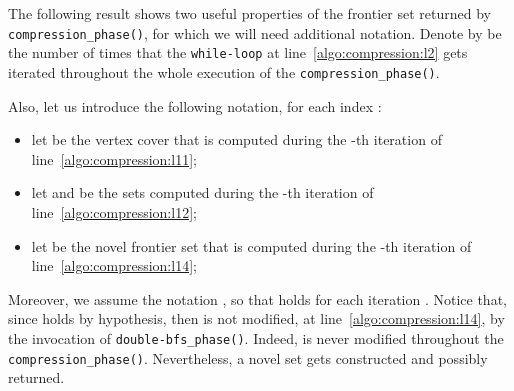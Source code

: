 The following result shows two useful properties of the frontier set returned by \texttt{compression\_phase()}, for which we will need additional notation.
Denote by  be the number of times that the \texttt{while-loop}
at line~\ref{algo:compression:l2} gets iterated throughout
the whole execution of the \texttt{compression\_phase()}.


Also, let us introduce the following notation, for each index :
\begin{itemize}
\item let  be the vertex cover that is computed during the -th iteration of line~\ref{algo:compression:l11};
\item let  and  be the sets computed during the -th iteration of line~\ref{algo:compression:l12};
\item let  be the novel frontier set that is computed during the -th iteration of line~\ref{algo:compression:l14};
\end{itemize}
Moreover, we assume the notation ,
so that  holds for each iteration .
Notice that, since  holds by hypothesis,
then  is not modified, at line~\ref{algo:compression:l14}, by the invocation of \texttt{double-bfs\_phase()}.
Indeed,  is never modified throughout the \texttt{compression\_phase()}.
Nevertheless, a novel set  gets constructed and possibly returned.


